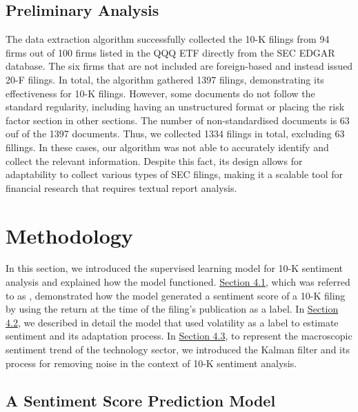 \documentclass[logo,bsc,singlespacing,parskip]{infthesis}
\begin{document}
\section{Preliminary Analysis}
The data extraction algorithm successfully collected the 10-K filings from 94 firms out of 100 firms listed in the QQQ ETF directly from the SEC EDGAR database. The six firms that are not included are foreign-based and instead issued 20-F filings. In total, the algorithm gathered 1397 filings, demonstrating its effectiveness for 10-K filings. However, some documents do not follow the standard regularity, including having an unstructured format or placing the risk factor section in other sections. The number of non-standardised documents is 63 ouf of the 1397 documents.  Thus, we collected 1334 filings in total, excluding 63 fillings. In these cases, our algorithm was not able to accurately identify and collect the relevant information. Despite this fact, its design allows for adaptability to collect various types of SEC filings, making it a scalable tool for financial research that requires textual report analysis. 


\chapter{Methodology}
In this section, we introduced the supervised learning model for 10-K sentiment analysis and explained how the model functioned. \hyperref[sec:sentiment_model]{Section 4.1}, which was referred to as \cite{ke2020predicting}, demonstrated how the model generated a sentiment score of a 10-K filing by using the return at the time of the filing’s publication as a label. In \hyperref[sec:volatility_label]{Section 4.2}, we described in detail the model that used volatility as a label to estimate sentiment and its adaptation process. In \hyperref[sec:kalman_filter]{Section 4.3}, to represent the macroscopic sentiment trend of the technology sector, we introduced the Kalman filter and its process for removing noise in the context of 10-K sentiment analysis. 

\section{A Sentiment Score Prediction Model}
\label{sec:sentiment_model}
\end{document}
